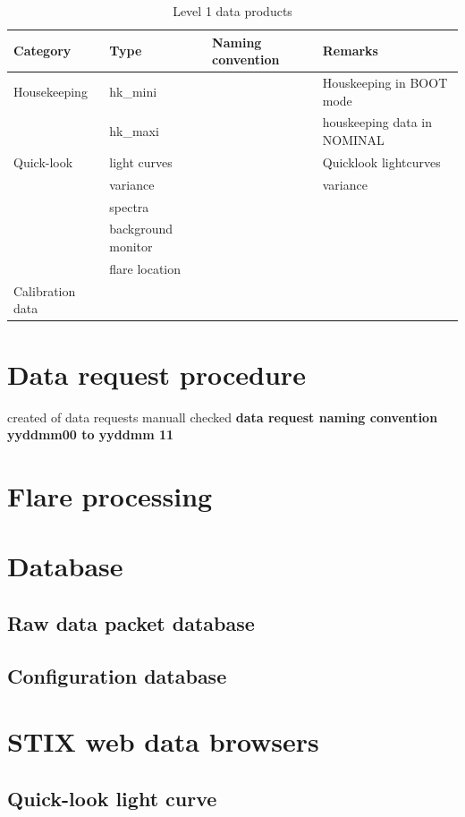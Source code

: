 \documentclass{aa}
\begin{document}
\begin{table}
\centering
\caption{Level 1 data products}
\begin{tabular}{llll}
Category & Type   &  Naming convention  & Remarks   \\ \hline
 Housekeeping & hk\_mini  &  & Houskeeping in BOOT mode   \\
 & hk\_maxi  &  & houskeeping data in NOMINAL   \\
 Quick-look &  light curves &  & Quicklook lightcurves \\
  &  variance &  & variance \\
  &  spectra &  &  \\
  &  background monitor &  &  \\
    &  flare location &  &  \\
 Calibration data &   &  &  \\
\end{tabular}
\end{table}

\section{Data request procedure}
created of data requests
manuall checked
\textbf{  data request naming convention  yyddmm00  to yyddmm 11 }


\section{Flare processing}

\section{Database}
\subsection{Raw data packet database } 
\subsection{Configuration database}

\section{STIX web data browsers}
\subsection{Quick-look light curve}
\end{document}
